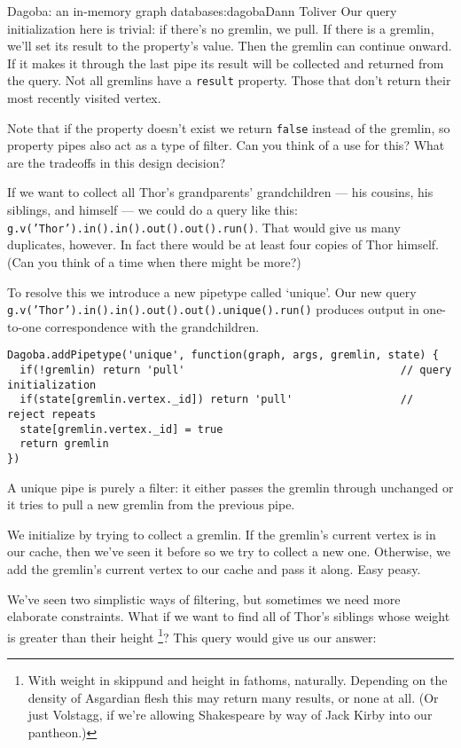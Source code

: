 \begin{aosachapter}{Dagoba: an in-memory graph database}{s:dagoba}{Dann Toliver}
Our query initialization here is trivial: if there's no gremlin, we
pull. If there is a gremlin, we'll set its result to the property's
value. Then the gremlin can continue onward. If it makes it through the
last pipe its result will be collected and returned from the query. Not
all gremlins have a \texttt{result} property. Those that don't return
their most recently visited vertex.

Note that if the property doesn't exist we return \texttt{false} instead
of the gremlin, so property pipes also act as a type of filter. Can you
think of a use for this? What are the tradeoffs in this design decision?

\label{unique}

If we want to collect all Thor's grandparents' grandchildren --- his
cousins, his siblings, and himself --- we could do a query like this:
\texttt{g.v('Thor').in().in().out().out().run()}. That would give us
many duplicates, however. In fact there would be at least four copies of
Thor himself. (Can you think of a time when there might be more?)

To resolve this we introduce a new pipetype called `unique'. Our new
query
\linebreak \texttt{g.v('Thor').in().in().out().out().unique().run()}
produces output in one-to-one correspondence with the grandchildren.

\begin{verbatim}
Dagoba.addPipetype('unique', function(graph, args, gremlin, state) {
  if(!gremlin) return 'pull'                                  // query initialization
  if(state[gremlin.vertex._id]) return 'pull'                 // reject repeats
  state[gremlin.vertex._id] = true
  return gremlin
})
\end{verbatim}

A unique pipe is purely a filter: it either passes the gremlin through
unchanged or it tries to pull a new gremlin from the previous pipe.

We initialize by trying to collect a gremlin. If the gremlin's current
vertex is in our cache, then we've seen it before so we try to collect a
new one. Otherwise, we add the gremlin's current vertex to our cache and
pass it along. Easy peasy.

\label{filter}

We've seen two simplistic ways of filtering, but sometimes we need more
elaborate constraints. What if we want to find all of Thor's siblings
whose weight is greater than their height \footnote{With weight in
  skippund and height in fathoms, naturally. Depending on the density of
  Asgardian flesh this may return many results, or none at all. (Or just
  Volstagg, if we're allowing Shakespeare by way of Jack Kirby into our
  pantheon.)}? This query would give us our answer:


\end{aosachapter}
